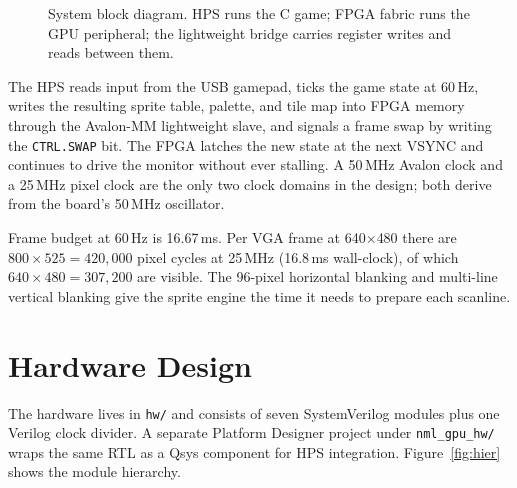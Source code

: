 \documentclass[11pt,letterpaper]{article}
\begin{document}
\begin{figure}[h]
{}
\caption{System block diagram. HPS runs the C game; FPGA fabric runs the GPU peripheral; the lightweight bridge carries register writes and reads between them.}
\label{fig:sysblock}
\end{figure}

The HPS reads input from the USB gamepad, ticks the game state at 60\,Hz,
writes the resulting sprite table, palette, and tile map into FPGA memory
through the Avalon-MM lightweight slave, and signals a frame swap by writing
the \texttt{CTRL.SWAP} bit. The FPGA latches the new state at the next VSYNC
and continues to drive the monitor without ever stalling. A 50\,MHz Avalon
clock and a 25\,MHz pixel clock are the only two clock domains in the design;
both derive from the board's 50\,MHz oscillator.

Frame budget at 60\,Hz is 16.67\,ms. Per VGA frame at 640$\times$480 there are
$800 \times 525 = 420{,}000$ pixel cycles at 25\,MHz (16.8\,ms wall-clock), of
which $640 \times 480 = 307{,}200$ are visible. The 96-pixel horizontal
blanking and multi-line vertical blanking give the sprite engine the time it
needs to prepare each scanline.

\section{Hardware Design}

The hardware lives in \texttt{hw/} and consists of seven SystemVerilog modules
plus one Verilog clock divider. A separate Platform Designer project under
\texttt{nml\_gpu\_hw/} wraps the same RTL as a Qsys component for HPS
integration. Figure~\ref{fig:hier} shows the module hierarchy.
\end{document}
